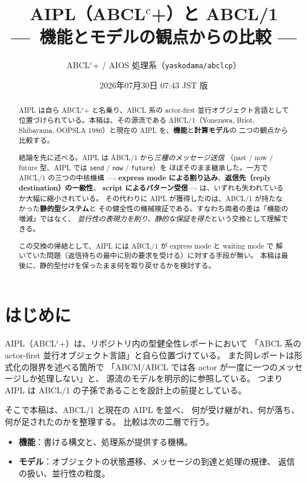 \documentclass[11pt,a4paper]{ltjsarticle}
\title{AIPL（ABCL$^{c}$+）と ABCL/1\\
{\large ---\ 機能とモデルの観点からの比較 ---}}
\author{ABCL$^{c}$+ / AIOS 処理系（\texttt{yaskodama/abclcp}）}
\date{2026年07月30日 07:43 JST 版}
\theoremstyle{remark}
\begin{document}
\maketitle

\begin{abstract}
AIPL は自ら ABCL$^{c}$+ と名乗り、ABCL 系の actor-first 並行オブジェクト言語として
位置づけられている。本稿は、その源流である ABCL/1（Yonezawa, Briot, Shibayama,
OOPSLA 1986）と現在の AIPL を、\textbf{機能}と\textbf{計算モデル}の 二つの観点から比較する。

結論を先に述べる。AIPL は ABCL/1 から\emph{三種のメッセージ送信}
（past / now / future 型、AIPL では \texttt{send} / \texttt{now} / \texttt{future}）を
ほぼそのまま継承した。一方で ABCL/1 の三つの中核機構
---- \textbf{express mode による割り込み}、\textbf{返信先（reply destination）の一級性}、
\textbf{script によるパターン受信}---- は、いずれも失われているか大幅に縮小されている。
その代わりに AIPL が獲得したのは、ABCL/1 が持たなかった\textbf{静的型システム}と
その健全性の機械検証である。すなわち両者の差は「機能の増減」ではなく、
\emph{並行性の表現力を削り、静的な保証を得た}という交換として理解できる。

この交換の帰結として、AIPL には ABCL/1 が express mode と waiting mode で
解いていた問題（返信待ちの最中に別の要求を受ける）に対する手段が無い。
本稿は最後に、静的型付けを保ったまま何を取り戻せるかを検討する。
\end{abstract}

\tableofcontents

\section{はじめに}

AIPL（ABCL$^{c}$+）は、リポジトリ内の型健全性レポートにおいて
「ABCL 系の actor-first 並行オブジェクト言語」と自ら位置づけている。
また同レポートは形式化の限界を述べる箇所で
「ABCM/ABCL では各 actor が一度に一つのメッセージしか処理しない」と、
源流のモデルを明示的に参照している。
つまり AIPL は ABCL/1 の子孫であることを設計上の前提としている。

そこで本稿は、ABCL/1 と現在の AIPL を並べ、
何が受け継がれ、何が落ち、何が足されたのかを整理する。
比較は次の二層で行う。

\begin{itemize}
\item \textbf{機能}：書ける構文と、処理系が提供する機構。
\item \textbf{モデル}：オブジェクトの状態遷移、メッセージの到達と処理の規律、
  返信の扱い、並行性の粒度。
\end{itemize}
\end{document}
